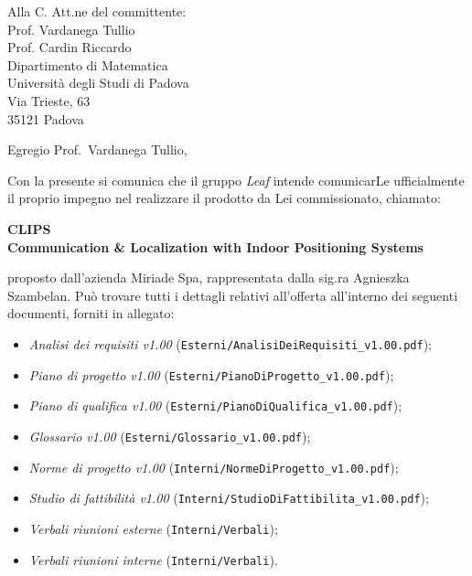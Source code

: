 \documentclass[a4paper,12pt]{letteracdp}
\author{Federico Tavella}
\date{22 gennaio 2016}
\begin{document}
	\begin{letter}{
		Alla C. Att.ne del committente: \\
		Prof. Vardanega Tullio \\
		Prof. Cardin Riccardo \\
		Dipartimento di Matematica \\
		Università degli Studi di Padova \\
		Via Trieste, 63 \\
		35121 Padova}
		
		\opening{Egregio Prof.~Vardanega Tullio,}
		Con la presente si comunica che il gruppo \textit{Leaf} intende comunicarLe ufficialmente il proprio impegno nel realizzare il prodotto da Lei commissionato, chiamato:
\begin{center}
	\textbf{CLIPS \\ Communication \& Localization with Indoor Positioning Systems}
\end{center}
proposto dall'azienda Miriade Spa, rappresentata dalla sig.ra Agnieszka Szambelan.
Può trovare tutti i dettagli relativi all'offerta all'interno dei seguenti documenti, forniti in allegato:

\begin{itemize}
	\item \textit{Analisi dei requisiti v1.00} (\texttt{Esterni/AnalisiDeiRequisiti\_v1.00.pdf});

	\item \textit{Piano di progetto v1.00} (\texttt{Esterni/PianoDiProgetto\_v1.00.pdf});

	\item \textit{Piano di qualifica v1.00} (\texttt{Esterni/PianoDiQualifica\_v1.00.pdf});
	
	\item \textit{Glossario v1.00} (\texttt{Esterni/Glossario\_v1.00.pdf});
	
	\item \textit{Norme di progetto v1.00} (\texttt{Interni/NormeDiProgetto\_v1.00.pdf});

	\item \textit{Studio di fattibilità v1.00} (\texttt{Interni/StudioDiFattibilita\_v1.00.pdf});

	\item \textit{Verbali riunioni esterne}	(\texttt{Interni/Verbali});
	
	\item \textit{Verbali riunioni interne} (\texttt{Interni/Verbali}).
	
\end{itemize}


\end{letter}
\end{document}

